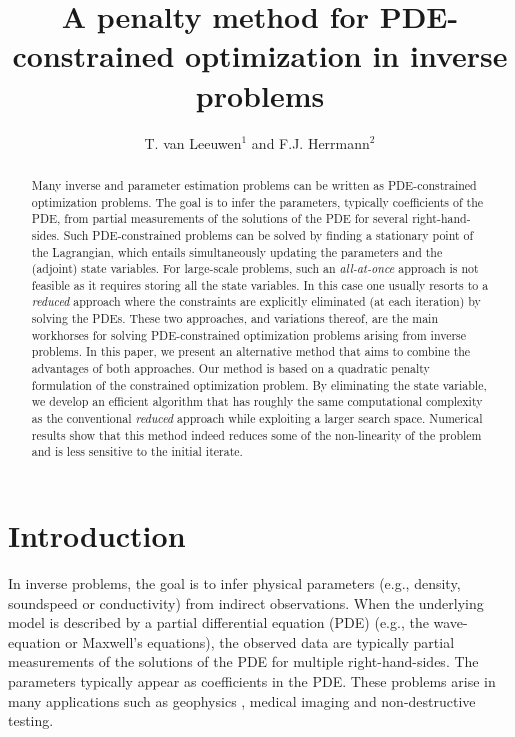 \documentclass{iopart}
\begin{document}
\title[A penalty method for inverse problems]{A penalty method for PDE-constrained optimization in inverse problems}
\author{T. van Leeuwen$^1$ and F.J. Herrmann$^2$}
\address{$^1$Mathematical Institute, Utrecht University, Utrecht, the Netherlands.\\
$^2$ Dept. of Earth, Ocean and Atmospheric Sciences, University of British Columbia, Vancouver (BC), Canada.}

\begin{abstract}
Many inverse and parameter estimation problems can be written as PDE-constrained optimization problems. The goal is to infer the parameters, typically coefficients of the PDE, from partial measurements of the solutions of the PDE for several right-hand-sides. Such PDE-constrained problems can be solved by finding a stationary point of the Lagrangian, which entails simultaneously updating the parameters and the (adjoint) state variables. For large-scale problems, such an \emph{all-at-once} approach is not feasible as it requires storing all the state variables. In this case one usually resorts to a \emph{reduced} approach where the constraints are explicitly eliminated (at each iteration) by solving the PDEs. These two approaches, and variations thereof, are the main workhorses for solving PDE-constrained optimization problems arising from inverse problems. In this paper, we present an alternative method that aims to combine the advantages of both approaches. Our method is based on a quadratic penalty formulation of the constrained optimization problem. By eliminating the state variable, we develop an efficient algorithm that has roughly the same computational complexity as the conventional \emph{reduced} approach while exploiting a larger search space. Numerical results show that this method indeed reduces some of the non-linearity of the problem and is less sensitive to the initial iterate.
\end{abstract}

\maketitle

\section{Introduction}
In inverse problems, the goal is to infer physical parameters (e.g., density, soundspeed or conductivity) from indirect observations. When the underlying model is described by a partial differential equation (PDE) (e.g., the wave-equation or Maxwell's equations), the observed data are typically partial measurements of the solutions of the PDE for multiple right-hand-sides. The parameters typically appear as coefficients in the PDE. These problems arise in many applications such as geophysics \cite{tarantola82,Haber2004,Epanomeritakis08,vanLeeuwen20133DFWI}, medical imaging \cite{Abdoulaev2005,Wang2015} and non-destructive testing.
\end{document}
